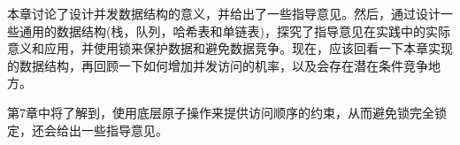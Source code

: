 
本章讨论了设计并发数据结构的意义，并给出了一些指导意见。然后，通过设计一些通用的数据结构(栈，队列，哈希表和单链表)，探究了指导意见在实践中的实际意义和应用，并使用锁来保护数据和避免数据竞争。现在，应该回看一下本章实现的数据结构，再回顾一下如何增加并发访问的机率，以及会存在潜在条件竞争地方。

第7章中将了解到，使用底层原子操作来提供访问顺序的约束，从而避免锁完全锁定，还会给出一些指导意见。